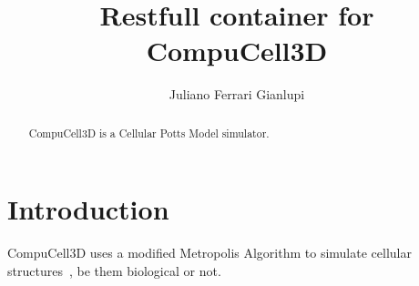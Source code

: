 
\title{Restfull container for CompuCell3D}

\author{Juliano Ferrari Gianlupi}


\renewcommand{\shortauthors}{J. F. Gianlupi}


\begin{abstract}

CompuCell3D is a Cellular Potts Model simulator. 

 
\end{abstract}



\maketitle

\section{Introduction}\label{hid-sp18-601-project-section-introduction}

CompuCell3D uses a modified Metropolis Algorithm to simulate cellular 
structures~\cite{hid-sp18-601-paper-swat2012multi}, be them biological or not.
 
 
\section{}\label{}

\subsection{}\label{}




 

